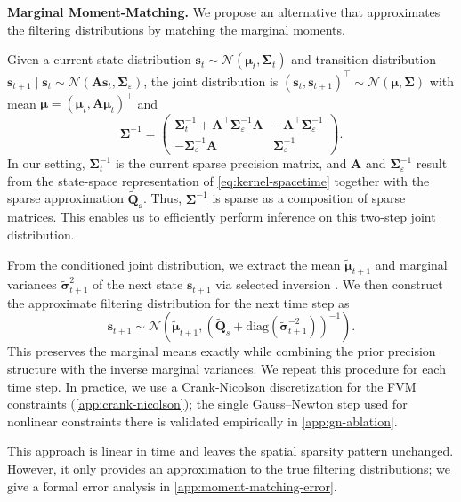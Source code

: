 \documentclass{article}
\theoremstyle{plain}
\theoremstyle{definition}
\theoremstyle{remark}
\begin{document}
\textbf{Marginal Moment-Matching.}
We propose an alternative that approximates the filtering distributions by matching the marginal moments.

Given a current state distribution $\bm{s}_t \sim \mathcal{N}(\bm{\mu}_t, \bm{\Sigma}_t)$ and transition distribution $\bm{s}_{t+1} \mid \bm{s}_t \sim \mathcal{N}(\bm{A} \bm{s}_t, \bm{\Sigma}_{\varepsilon})$, the joint distribution is $(\bm{s}_t, \bm{s}_{t+1})^\top \sim \mathcal{N}(\bm{\mu}, \bm{\Sigma})$ with mean $\bm{\mu} = (\bm{\mu}_t, \bm{A}\bm{\mu}_t)^\top$ and
\begin{equation}
\bm{\Sigma}^{-1} = \begin{pmatrix}
\bm{\Sigma}_t^{-1} + \bm{A}^\top \bm{\Sigma}_\varepsilon^{-1} \bm{A} & -\bm{A}^\top \bm{\Sigma}_\varepsilon^{-1} \\
-\bm{\Sigma}_\varepsilon^{-1} \bm{A} & \bm{\Sigma}_\varepsilon^{-1}
\end{pmatrix}.
\end{equation}
In our setting, $\bm{\Sigma}_t^{-1}$ is the current sparse precision matrix, and $\bm{A}$ and $\bm{\Sigma}_\varepsilon^{-1}$ result from the state-space representation of \cref{eq:kernel-spacetime} together with the sparse approximation $\bm{\tilde{Q}_s}$.
Thus, $\bm{\Sigma}^{-1}$ is sparse as a composition of sparse matrices.
This enables us to efficiently perform inference on this two-step joint distribution.

From the conditioned joint distribution, we extract the mean $\bm{\tilde{\mu}}_{t+1}$ and marginal variances $\bm{\tilde{\sigma}}_{t+1}^2$ of the next state $\bm{s}_{t+1}$ via selected inversion \citep{linSelInvAnAlgorithmSelected2011}.
We then construct the approximate filtering distribution for the next time step as
\begin{equation}
    \bm{s}_{t+1} \sim \mathcal{N}\left(\bm{\tilde{\mu}}_{t+1}, \left(\bm{\tilde{Q}}_s + \mathrm{diag}(\bm{\tilde{\sigma}}_{t+1}^{-2})\right)^{-1}\right).
\end{equation}
This preserves the marginal means exactly while combining the prior precision structure with the inverse marginal variances.
We repeat this procedure for each time step.
In practice, we use a Crank-Nicolson discretization for the FVM constraints (\cref{app:crank-nicolson}); the single Gauss--Newton step used for nonlinear constraints there is validated empirically in \cref{app:gn-ablation}.

This approach is linear in time and leaves the spatial sparsity pattern unchanged.
However, it only provides an approximation to the true filtering distributions; we give a formal error analysis in \cref{app:moment-matching-error}.
\end{document}
